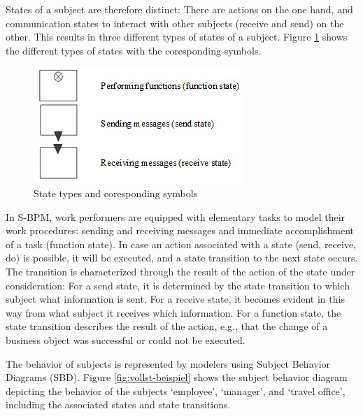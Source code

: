 States of a subject are therefore distinct: There are actions on the one hand, and communication states to interact with other subjects (receive and send) on the other. This results in three different types of states of a subject. Figure \ref{fig:behavior-symbole} shows the different types of states with the coresponding symbols.

\begin{figure}[ph]
	\centering
	\includegraphics[width=0.5\linewidth]{20181026-Ontologie-Bilder/Grafiken-Ontologie/SUbjectExecution/Behavior-Symbole}
	\caption[State types and coresponding symbols]{State types and coresponding symbols}
	\label{fig:behavior-symbole}
\end{figure}

In S-BPM, work performers are equipped with elementary tasks to model their work procedures: sending and receiving messages and immediate accomplishment of a task (function state).
In case an action associated with a state (send, receive, do) is possible, it will be executed, and a state transition to the next state occurs. The transition is characterized through the result of the action of the state under consideration: For a send state, it is determined by the state transition to which subject what information is sent. For a receive state, it becomes evident in this way from what subject it receives which information. For a function state, the state transition describes the result of the action, e.g., that the change of a business object was successful or could not be executed.

The behavior of subjects is represented by modelers using Subject Behavior Diagrams (SBD). Figure \ref{fig:vollst-beispiel} shows the subject behavior diagram depicting the behavior of the subjects ‘employee’, ‘manager’, and ‘travel office’, including the associated states and state transitions. 

